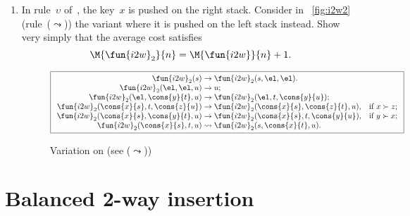 \begin{enumerate}
  \item In rule~\(\upsilon\) of~,
    the key~\(x\) is pushed on the right stack. Consider in
    \fig~\vref{fig:i2w2} (rule~(\(\leadsto\))) the variant where it is
    pushed on the left stack instead. Show very simply that the
    average cost satisfies
     
    \begin{equation*}
      \M{\fun{i2w}_2}{n} = \M{\fun{i2w}}{n} + 1.
    \end{equation*}
    \begin{figure}[h]
    \begin{equation*}
      \boxed{%
      \begin{array}{r@{\;}l@{\;}ll}
        \fun{i2w}_2(s)         & \rightarrow
                               & \fun{i2w}_2(s,\el,\el).\\
        \fun{i2w}_2(\el,\el,u) & \rightarrow
                               & u;\\
        \fun{i2w}_2(\el,\cons{y}{t},u)
                               & \rightarrow
                               & \fun{i2w}_2(\el,t,\cons{y}{u});\\
        \fun{i2w}_2(\cons{x}{s},t,\cons{z}{u})
                               & \rightarrow
                               & \fun{i2w}_2(\cons{x}{s},\cons{z}{t},u),
                               & \text{if \(x \succ z\)};\\
        \fun{i2w}_2(\cons{x}{s},\cons{y}{t},u)
                               & \rightarrow
                               & \fun{i2w}_2(\cons{x}{s},t,\cons{y}{u}),
                               & \text{if \(y \succ x\)};\\
        \fun{i2w}_2(\cons{x}{s},t,u)
                               & \leadsto
                               & \fun{i2w}_2(s,\cons{x}{t},u).
      \end{array}}
    \end{equation*}
    \caption{Variation  on  (see
      (\(\leadsto\)))}
    \label{fig:i2w2}
    \end{figure}

\end{enumerate}

\section{Balanced 2-way insertion}

